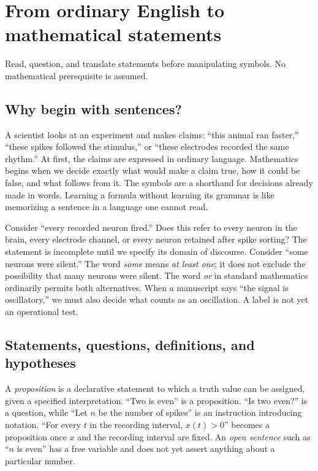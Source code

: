 \chapter{From ordinary English to mathematical statements}\label{ch:english}
\begin{readergoal}Read, question, and translate statements before manipulating symbols. No mathematical prerequisite is assumed.\end{readergoal}
\section{Why begin with sentences?}
A scientist looks at an experiment and makes claims: ``this animal ran faster,'' ``these spikes followed the stimulus,'' or ``these electrodes recorded the same rhythm.'' At first, the claims are expressed in ordinary language. Mathematics begins when we decide exactly what would make a claim true, how it could be false, and what follows from it. The symbols are a shorthand for decisions already made in words. Learning a formula without learning its grammar is like memorizing a sentence in a language one cannot read.

Consider ``every recorded neuron fired.'' Does this refer to every neuron in the brain, every electrode channel, or every neuron retained after spike sorting? The statement is incomplete until we specify its domain of discourse. Consider ``some neurons were silent.'' The word \emph{some} means \emph{at least one}; it does not exclude the possibility that many neurons were silent. The word \emph{or} in standard mathematics ordinarily permits both alternatives. When a manuscript says ``the signal is oscillatory,'' we must also decide what counts as an oscillation. A label is not yet an operational test.

\section{Statements, questions, definitions, and hypotheses}
A \emph{proposition} is a declarative statement to which a truth value can be assigned, given a specified interpretation. ``Two is even'' is a proposition. ``Is two even?'' is a question, while ``Let $n$ be the number of spikes'' is an instruction introducing notation. ``For every $t$ in the recording interval, $x(t)>0$'' becomes a proposition once $x$ and the recording interval are fixed. An \emph{open sentence} such as ``$n$ is even'' has a free variable and does not yet assert anything about a particular number.

